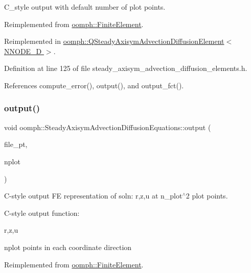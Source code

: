 C\+\_\+style output with default number of plot points. 



Reimplemented from \hyperlink{classoomph_1_1FiniteElement_a72cddd09f8ddbee1a20a1ff404c6943e}{oomph\+::\+Finite\+Element}.



Reimplemented in \hyperlink{classoomph_1_1QSteadyAxisymAdvectionDiffusionElement_a9af8f58f84ee30a6fdb2357afd8df51c}{oomph\+::\+Q\+Steady\+Axisym\+Advection\+Diffusion\+Element$<$ N\+N\+O\+D\+E\+\_\+D $>$}.



Definition at line 125 of file steady\+\_\+axisym\+\_\+advection\+\_\+diffusion\+\_\+elements.\+h.



References compute\+\_\+error(), output(), and output\+\_\+fct().

\mbox{\label{classoomph_1_1SteadyAxisymAdvectionDiffusionEquations_a73bafda6b2fe21fff87952630f86aa31}} 
\subsubsection{\texorpdfstring{output()}{output()}\hspace{0.1cm}{\footnotesize\ttfamily [4/4]}}
{\footnotesize\ttfamily void oomph\+::\+Steady\+Axisym\+Advection\+Diffusion\+Equations\+::output (\begin{DoxyParamCaption}\item[{F\+I\+LE $\ast$}]{file\+\_\+pt,  }\item[{const unsigned \&}]{nplot }\end{DoxyParamCaption})\hspace{0.3cm}{\ttfamily [virtual]}}



C-\/style output FE representation of soln\+: r,z,u at n\+\_\+plot$^\wedge$2 plot points. 

C-\/style output function\+:

r,z,u

nplot points in each coordinate direction 

Reimplemented from \hyperlink{classoomph_1_1FiniteElement_adfaee690bb0608f03320eeb9d110d48c}{oomph\+::\+Finite\+Element}.



